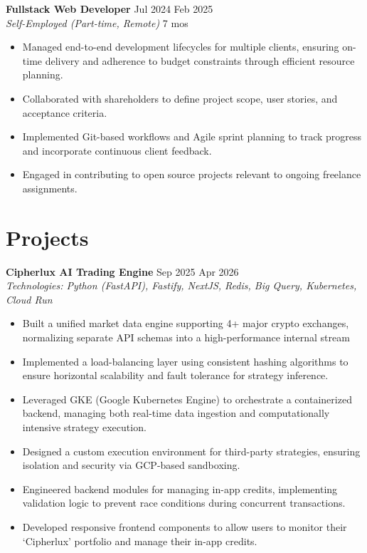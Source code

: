 \documentclass[10pt, a4paper]{article}
\begin{document}
\textbf{Fullstack Web Developer} \hfill Jul 2024 \textendash{} Feb 2025 \\
\textit{Self-Employed (Part-time, Remote)} \hfill 7 mos
\begin{itemize}
    \item Managed end-to-end development lifecycles for multiple clients, ensuring on-time delivery and adherence to budget constraints through efficient resource planning.
    \item Collaborated with shareholders to define project scope, user stories, and acceptance criteria.
    \item Implemented Git-based workflows and Agile sprint planning to track progress and incorporate continuous client feedback.
    \item Engaged in contributing to open source projects relevant to ongoing freelance assignments.
\end{itemize}

\section{Projects}
\textbf{Cipherlux \textendash{} AI Trading Engine} \hfill Sep 2025 \textendash{} Apr 2026 \\
\textit{Technologies: Python (FastAPI), Fastify, NextJS, Redis, Big Query, Kubernetes, Cloud Run}
\begin{itemize}
    \item Built a unified market data engine supporting 4+ major crypto exchanges, normalizing separate API schemas into a high-performance internal stream
    \item Implemented a load-balancing layer using consistent hashing algorithms to ensure horizontal scalability and fault tolerance for strategy inference.
    \item Leveraged GKE (Google Kubernetes Engine) to orchestrate a containerized backend, managing both real-time data ingestion and computationally intensive strategy execution.
    \item Designed a custom execution environment for third-party strategies, ensuring isolation and security via GCP-based sandboxing.
    \item Engineered backend modules for managing in-app credits, implementing validation logic to prevent race conditions during concurrent transactions.
    \item Developed responsive frontend components to allow users to monitor their `Cipherlux' portfolio and manage their in-app credits.
\end{itemize}
\end{document}
